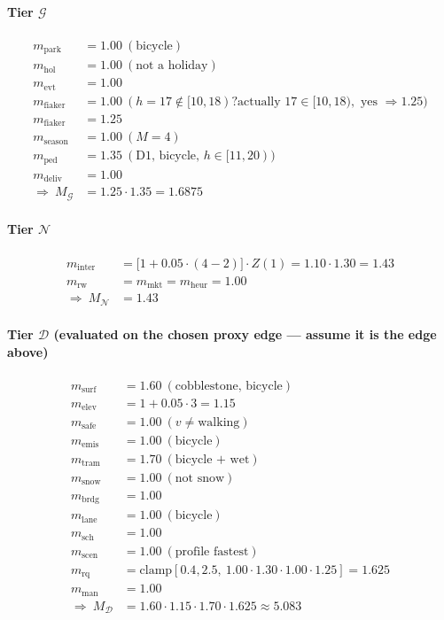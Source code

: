 \documentclass[12pt,a4paper]{article}
\begin{document}
\paragraph{Tier $\mathcal{G}$}
\begin{align*}
m_{\text{park}} &= 1.00 \ (\text{bicycle}) \\
m_{\text{hol}}  &= 1.00 \ (\text{not a holiday}) \\
m_{\text{evt}}  &= 1.00 \\
m_{\text{fiaker}} &= 1.00 \ (h=17\notin[10,18)? \text{actually }17\in[10,18),\text{ yes }\Rightarrow 1.25) \\
m_{\text{fiaker}} &= 1.25 \\
m_{\text{season}} &= 1.00 \ (M=4) \\
m_{\text{ped}}   &= 1.35 \ (\text{D1, bicycle, } h\in[11,20)) \\
m_{\text{deliv}} &= 1.00 \\[2pt]
\Rightarrow\ M_{\mathcal{G}} &= 1.25\cdot 1.35 = 1.6875
\end{align*}

\paragraph{Tier $\mathcal{N}$}
\begin{align*}
m_{\text{inter}} &= \bigl[1 + 0.05\cdot (4-2)\bigr]\cdot Z(1) = 1.10\cdot 1.30 = 1.43 \\
m_{\text{rw}} &= m_{\text{mkt}} = m_{\text{heur}} = 1.00 \\[2pt]
\Rightarrow\ M_{\mathcal{N}} &= 1.43
\end{align*}

\paragraph{Tier $\mathcal{D}$ (evaluated on the chosen proxy edge — assume it is the edge above)}
\begin{align*}
m_{\text{surf}}   &= 1.60 \ (\text{cobblestone, bicycle}) \\
m_{\text{elev}}   &= 1 + 0.05\cdot 3 = 1.15 \\
m_{\text{safe}}   &= 1.00 \ (v\ne\text{walking}) \\
m_{\text{emis}}   &= 1.00 \ (\text{bicycle}) \\
m_{\text{tram}}   &= 1.70 \ (\text{bicycle + wet}) \\
m_{\text{snow}}   &= 1.00 \ (\text{not snow}) \\
m_{\text{brdg}}   &= 1.00 \\
m_{\text{lane}}   &= 1.00 \ (\text{bicycle}) \\
m_{\text{sch}}    &= 1.00 \\
m_{\text{scen}}   &= 1.00 \ (\text{profile fastest}) \\
m_{\text{rq}}     &= \mathrm{clamp}[0.4,2.5,\ 1.00\cdot 1.30\cdot 1.00\cdot 1.25] = 1.625 \\
m_{\text{man}}    &= 1.00 \\[2pt]
\Rightarrow\ M_{\mathcal{D}} &= 1.60\cdot 1.15\cdot 1.70\cdot 1.625 \approx 5.083
\end{align*}
\end{document}
